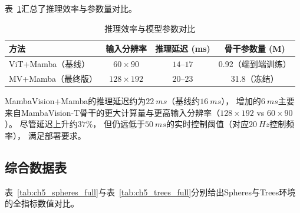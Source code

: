 \FloatBarrier
表~\ref{tab:ch5_efficiency}汇总了推理效率与参数量对比。

\begin{table}[htbp]
\centering
\caption{推理效率与模型参数对比}
\label{tab:ch5_efficiency}
\begin{tabular}{lccc}
\toprule
\textbf{方法} & \textbf{输入分辨率} & \textbf{推理延迟 (ms)} & \textbf{骨干参数量 (M)} \\
\midrule
ViT+Mamba（基线） & $60\times90$ & $14$--$17$ & 0.92（端到端训练） \\
MV+Mamba（最终版） & $128\times192$ & $20$--$23$ & 31.8（冻结） \\
\bottomrule
\end{tabular}
\end{table}

MambaVision+Mamba的推理延迟约为$\SI{22}{ms}$（基线约$\SI{16}{ms}$），
增加的$\SI{6}{ms}$主要来自MambaVision-T骨干的更大计算量与更高输入分辨率（$128\times192$ vs $60\times90$）。
尽管延迟上升约$37\%$，
但仍远低于$\SI{50}{ms}$的实时控制阈值（对应$\SI{20}{Hz}$控制频率），
满足部署要求。

\subsection{综合数据表}

表~\ref{tab:ch5_spheres_full}与表~\ref{tab:ch5_trees_full}分别给出Spheres与Trees环境的全指标数值对比。

